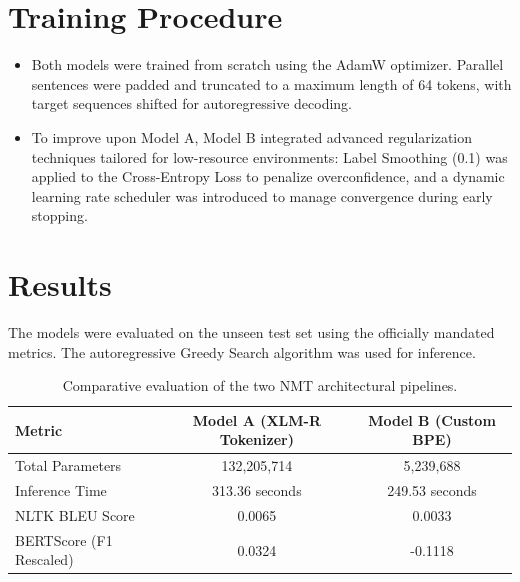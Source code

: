 \documentclass[11pt]{article}
\begin{document}
\section{Training Procedure}
\begin{itemize}[leftmargin=*]
    \item Both models were trained from scratch using the AdamW optimizer. Parallel sentences were padded and truncated to a maximum length of 64 tokens, with target sequences shifted for autoregressive decoding.
    \item To improve upon Model A, Model B integrated advanced regularization techniques tailored for low-resource environments: Label Smoothing (0.1) was applied to the Cross-Entropy Loss to penalize overconfidence, and a dynamic learning rate scheduler was introduced to manage convergence during early stopping.
\end{itemize} 


\section{Results}
The models were evaluated on the unseen test set using the officially mandated metrics. The autoregressive Greedy Search algorithm was used for inference.

\vspace{0.5em}
\begin{table}[h]
    \centering
    \begin{tabular}{@{}lcc@{}}
        \toprule
        \textbf{Metric} & \textbf{Model A (XLM-R Tokenizer)} & \textbf{Model B (Custom BPE)} \\
        \midrule
        Total Parameters & 132,205,714 & 5,239,688 \\
        Inference Time & 313.36 seconds & 249.53 seconds \\
        NLTK BLEU Score & 0.0065 & 0.0033 \\
        BERTScore (F1 Rescaled) & 0.0324 & -0.1118 \\
        \bottomrule
    \end{tabular}
    \caption{Comparative evaluation of the two NMT architectural pipelines.}
\end{table}
\vspace{0.5em}
\end{document}
